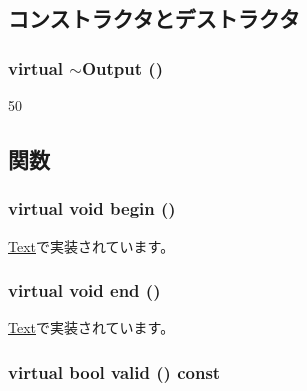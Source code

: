 \subsection{コンストラクタとデストラクタ}
\hypertarget{structStats_1_1Output_a8c3620b32551505c8ee5ff51b59e57aa}{
\subsubsection[{$\sim$Output}]{\setlength{\rightskip}{0pt plus 5cm}virtual $\sim${\bf Output} ()}}
\label{structStats_1_1Output_a8c3620b32551505c8ee5ff51b59e57aa}



\begin{DoxyCode}
50 {}
\end{DoxyCode}


\subsection{関数}
\hypertarget{structStats_1_1Output_aaf893c33f3c041e289a12c153dcc9789}{
\subsubsection[{begin}]{\setlength{\rightskip}{0pt plus 5cm}virtual void begin ()}}
\label{structStats_1_1Output_aaf893c33f3c041e289a12c153dcc9789}


\hyperlink{classStats_1_1Text_ab0bdf5cca484fb2ba637c39384b27fb2}{Text}で実装されています。\hypertarget{structStats_1_1Output_aa540e86022c1f72380d1014d98f38f43}{
\subsubsection[{end}]{\setlength{\rightskip}{0pt plus 5cm}virtual void end ()}}
\label{structStats_1_1Output_aa540e86022c1f72380d1014d98f38f43}


\hyperlink{classStats_1_1Text_aaf81d3fdaf258088d7692fa70cece087}{Text}で実装されています。\hypertarget{structStats_1_1Output_ad9248394f673632ebda5b9c455e464f2}{
\subsubsection[{valid}]{\setlength{\rightskip}{0pt plus 5cm}virtual bool valid () const}}
\label{structStats_1_1Output_ad9248394f673632ebda5b9c455e464f2}


